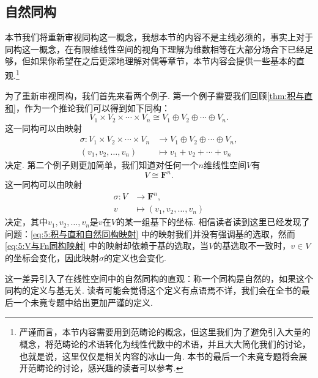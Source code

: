 \subsection{自然同构} \label{subsec:自然同构}

本节我们将重新审视同构这一概念，我想本节的内容不是主线必须的，事实上对于同构这一概念，在有限维线性空间的视角下理解为维数相等在大部分场合下已经足够，但如果你希望在之后更深地理解对偶等章节，本节内容会提供一些基本的直观.\footnote{严谨而言，本节内容需要用到范畴论的概念，但这里我们为了避免引入大量的概念，将范畴论的术语转化为线性代数中的术语，并且大大简化我们的讨论，也就是说，这里仅仅是相关内容的冰山一角. 本书的最后一个未竟专题将会展开范畴论的讨论，感兴趣的读者可以参考.}

为了重新审视同构，我们首先来看两个例子. 第一个例子需要我们回顾\autoref{thm:积与直和}，作为一个推论我们可以得到如下同构：
\begin{equation} \label{eq:5:积与直和自然同构}
    V_1\times V_2\times\cdots\times V_n\cong V_1\oplus V_2\oplus\cdots\oplus V_n.
\end{equation}
这一同构可以由映射
\begin{equation} \label{eq:5:积与直和自然同构映射}
    \begin{aligned}
        \sigma:V_1\times V_2\times\cdots\times V_n & \to V_1\oplus V_2\oplus\cdots\oplus V_n, \\
        (v_1,v_2,\ldots,v_n)                       & \mapsto v_1+v_2+\cdots+v_n
    \end{aligned}
\end{equation}
决定. 第二个例子则更加简单，我们知道对任何一个$n$维线性空间$V$有
\begin{equation} \label{eq:5:V与Fn同构}
    V\cong\mathbf{F}^n.
\end{equation}
这一同构可以由映射
\begin{equation} \label{eq:5:V与Fn同构映射}
    \begin{aligned}
        \sigma:V & \to\mathbf{F}^n,            \\
        v        & \mapsto(v_1,v_2,\ldots,v_n)
    \end{aligned}
\end{equation}
决定，其中$v_1,v_2,\ldots,v_n$是$v$在$V$的某一组基下的坐标. 相信读者读到这里已经发现了问题：\autoref{eq:5:积与直和自然同构映射} 中的映射我们并没有强调基的选取，然而\autoref{eq:5:V与Fn同构映射} 中的映射却依赖于基的选取，当$V$的基选取不一致时，$v\in V$的坐标会变化，因此映射$\sigma$的定义也会变化.

这一差异引入了在线性空间中的自然同构的直观：称一个同构是自然的，如果这个同构的定义与基无关. 读者可能会觉得这个定义有点语焉不详，我们会在全书的最后一个未竟专题中给出更加严谨的定义.

